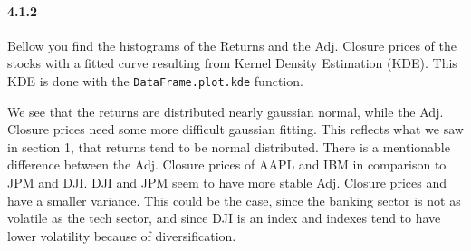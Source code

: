 \documentclass[11pt]{article}
\begin{document}
    \hypertarget{section}{%
\paragraph{4.1.2}\label{section}}

    Bellow you find the histograms of the Returns and the Adj. Closure
prices of the stocks with a fitted curve resulting from Kernel Density
Estimation (KDE). This KDE is done with the \texttt{DataFrame.plot.kde}
function.

We see that the returns are distributed nearly gaussian normal, while
the Adj. Closure prices need some more difficult gaussian fitting. This
reflects what we saw in section 1, that returns tend to be normal
distributed. There is a mentionable difference between the Adj. Closure
prices of AAPL and IBM in comparison to JPM and DJI. DJI and JPM seem to
have more stable Adj. Closure prices and have a smaller variance. This
could be the case, since the banking sector is not as volatile as the
tech sector, and since DJI is an index and indexes tend to have lower
volatility because of diversification.
\end{document}
